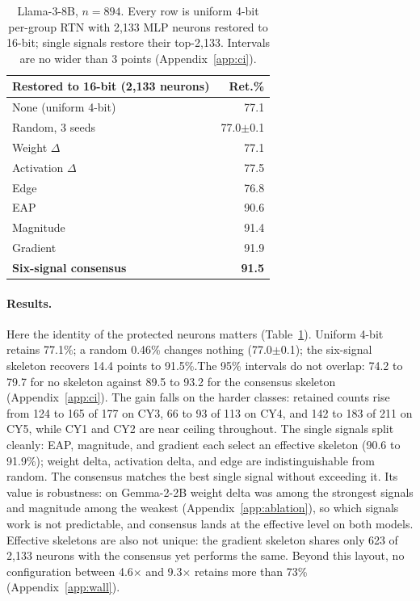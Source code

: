 \documentclass[11pt]{article}
\begin{document}
\begin{table}[t]
\centering
\small
\begin{tabular}{lr}
\toprule
\textbf{Restored to 16-bit (2,133 neurons)} & \textbf{Ret.\%} \\
\midrule
None (uniform 4-bit) & 77.1 \\
Random, 3 seeds & 77.0$\pm$0.1 \\
\midrule
Weight $\Delta$ & 77.1 \\
Activation $\Delta$ & 77.5 \\
Edge & 76.8 \\
EAP & 90.6 \\
Magnitude & 91.4 \\
Gradient & 91.9 \\
\midrule
\textbf{Six-signal consensus} & \textbf{91.5} \\
\bottomrule
\end{tabular}
\caption{Llama-3-8B, $n{=}894$. Every row is uniform 4-bit 
per-group RTN with 2,133 MLP neurons restored to 16-bit; single 
signals restore their top-2,133. Intervals are no wider than 
3 points (Appendix~\ref{app:ci}).}
\label{tab:llama}
\end{table}

\paragraph{Results.}
Here the identity of the protected neurons matters 
(Table~\ref{tab:llama}). Uniform 4-bit retains 77.1\%; a random 
0.46\% changes nothing (77.0$\pm$0.1); the six-signal skeleton 
recovers 14.4 points to 91.5\%.The 95\% intervals do not overlap: 74.2 to 79.7 for no skeleton against 89.5 to 93.2 for the consensus skeleton 
(Appendix~\ref{app:ci}). The gain falls on the harder 
classes: retained counts rise from 124 to 165 of 177 on CY3, 66 
to 93 of 113 on CY4, and 142 to 183 of 211 on CY5, while CY1 
and CY2 are near ceiling throughout. The single signals split 
cleanly: EAP, magnitude, and gradient each select an effective 
skeleton (90.6 to 91.9\%); weight delta, activation delta, and 
edge are indistinguishable from random. The consensus matches 
the best single signal without exceeding it. Its value is 
robustness: on Gemma-2-2B weight delta was among the strongest 
signals and magnitude among the weakest 
(Appendix~\ref{app:ablation}), so which signals work is not 
predictable, and consensus lands at the effective level on both 
models. Effective skeletons are also not unique: the gradient 
skeleton shares only 623 of 2,133 neurons with the consensus 
yet performs the same. Beyond this layout, no configuration 
between 4.6$\times$ and 9.3$\times$ retains more than 73\% 
(Appendix~\ref{app:wall}).
\end{document}
